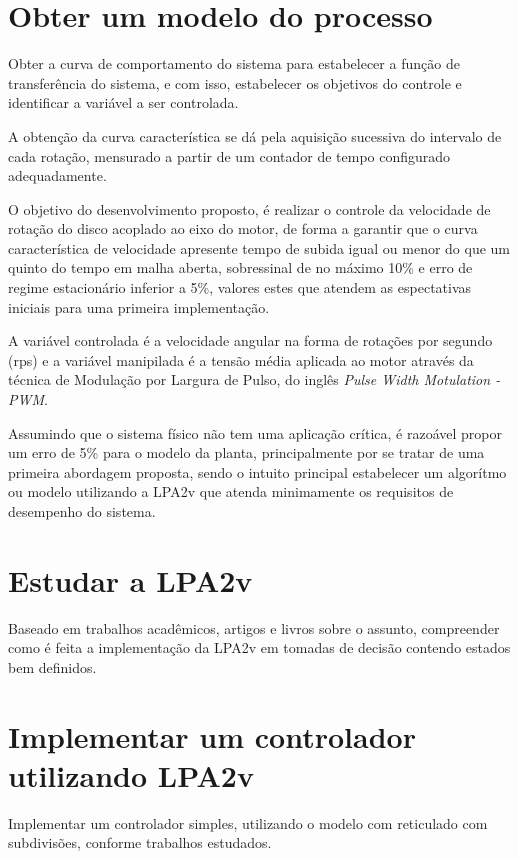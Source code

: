 \section{ Obter um modelo do processo }
Obter a curva de comportamento do sistema para 
estabelecer a função de transferência do sistema,  
e com isso, 
estabelecer os objetivos do controle e 
identificar a variável a ser controlada.


A obtenção da curva característica se dá 
pela aquisição sucessiva do intervalo de cada rotação, 
mensurado a partir de um contador de tempo configurado adequadamente. 


O objetivo do desenvolvimento proposto, 
é realizar o controle da velocidade de rotação do disco acoplado ao eixo do motor, 
de forma a garantir que o curva característica de velocidade apresente
tempo de subida igual ou menor do que um quinto do tempo em malha aberta, 
sobressinal de no máximo 10\% e erro de regime estacionário inferior a 5\%, 
valores estes que atendem as espectativas iniciais para uma primeira implementação.


A variável controlada é a velocidade angular 
na forma de rotações por segundo (rps) 
e a variável manipilada é a tensão média 
aplicada ao motor através da técnica de 
Modulação por Largura de Pulso, 
do inglês \emph{Pulse Width Motulation - PWM}.


Assumindo que o sistema físico não tem uma aplicação crítica, 
é razoável propor um erro de 5\% para o modelo da planta, 
principalmente por se tratar de uma primeira abordagem proposta, 
sendo o intuito principal estabelecer um algorítmo ou 
modelo utilizando a LPA2v que 
atenda minimamente os requisitos de desempenho do sistema.


\section{ Estudar a LPA2v }

Baseado em trabalhos acadêmicos, artigos e livros sobre o assunto, compreender como é feita a implementação da LPA2v em tomadas de decisão contendo estados bem definidos.

\section{ Implementar um controlador utilizando LPA2v}

Implementar um controlador simples, utilizando o modelo com reticulado com subdivisões, conforme trabalhos estudados. 

